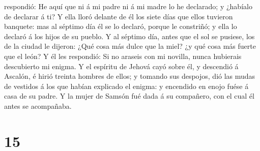 respondió: He aquí que ni á mi padre ni á mi madre lo he declarado; y
¿habíalo de declarar á ti?  Y ella lloró delante de él los
siete días que ellos tuvieron banquete: mas al séptimo día él se lo
declaró, porque le constriñó; y ella lo declaró á los hijos de su
pueblo.  Y al séptimo día, antes que el sol se pusiese, los
de la ciudad le dijeron: ¿Qué cosa más dulce que la miel? ¿y qué cosa
más fuerte que el león?  Y él les respondió: Si no araseis
con mi novilla, nunca hubierais descubierto mi enigma.  Y
el espíritu de Jehová cayó sobre él, y descendió á Ascalón, é hirió
treinta hombres de ellos; y tomando sus despojos, dió las mudas de
vestidos á los que habían explicado el enigma: y encendido en enojo
fuése á casa de su padre. Y la mujer de Samsón fué dada á su compañero,
con el cual él antes se acompañaba.

\hypertarget{section-14}{%
\section{15}\label{section-14}}

